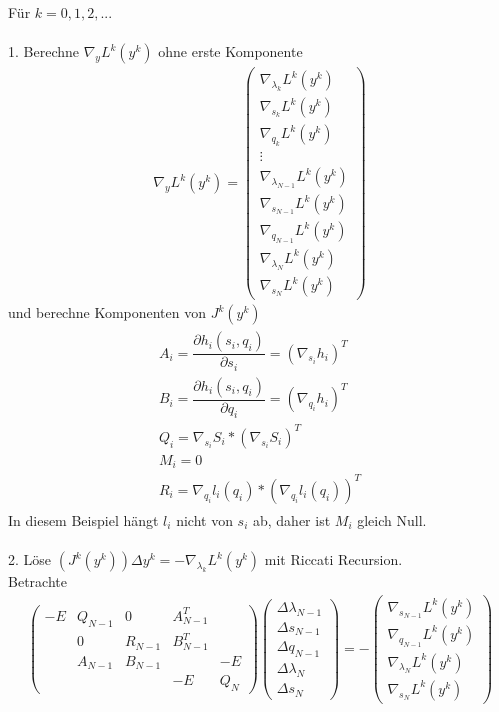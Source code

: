 \documentclass[12pt,a4paper]{article}
\begin{document}
  Für $k = 0,1,2,...$ \\
  \\
  1. Berechne $\nabla_y L^{k}(y^{k})$ ohne erste Komponente
  \begin{align*}
  \nabla_y L^{k}(y^{k}) = \left( \begin{array}{c}
  \nabla_{\lambda_{k}} L^{k}(y^{k}) \\ \hline
  \nabla_{s_{k}} L^{k}(y^{k}) \\
  \nabla_{q_{k}} L^{k}(y^{k}) \\
  \vdots \\
  \nabla_{\lambda_{N-1}} L^{k}(y^{k}) \\ 
  \nabla_{s_{N-1}} L^{k}(y^{k}) \\
  \nabla_{q_{N-1}} L^{k}(y^{k}) \\
  \nabla_{\lambda_{N}} L^{k}(y^{k}) \\ 
  \nabla_{s_{N}} L^{k}(y^{k})
  \end{array} \right) 
  \end{align*}
  und berechne Komponenten von $J^{k}(y^{k})$ \\
  \begin{align*}
  \begin{array}{l}
  A_i = \dfrac{\partial h_i(s_i,q_i)}{\partial s_i}= (\nabla_{s_i} h_i)^{T}\\ 
  B_i = \dfrac{\partial h_i(s_i,q_i)}{\partial q_i}= (\nabla_{q_i} h_i)^{T} \\
  Q_i = \nabla_{s_i} S_i *(\nabla_{s_i} S_i )^{T} \\
  M_i = 0 \\
  R_i = \nabla_{q_i} l_i(q_i) * (\nabla_{q_i} l_i(q_i))^{T}
  \end{array}
  \end{align*}
  In diesem Beispiel hängt $ l_i $ nicht von $s_i$ ab, daher ist $M_i$ gleich Null. \\
  \\
  2. Löse $ (J^{k}(y^{k})) \Delta y^{k} =- \nabla_{\lambda_k} L^{k}(y^{k}) $ mit Riccati Recursion.\\
  Betrachte
  \begin{align*}
  \begin{pmatrix}
  -E & Q_{N-1} & 0 & A_{N-1}^{T} &  \\
     & 0 & R_{N-1} & B_{N-1}^{T} &  \\
     & A_{N-1} & B_{N-1} &   & -E \\
     &   &   & -E & Q_N
  \end{pmatrix}
  \begin{pmatrix}
  \Delta \lambda_{N-1} \\
  \Delta s_{N-1} \\
  \Delta q_{N-1} \\
  \Delta \lambda_{N} \\
  \Delta s_N
  \end{pmatrix} =-
  \begin{pmatrix}
  \nabla_{s_{N-1}} L^{k}(y^{k}) \\
  \nabla_{q_{N-1}} L^{k}(y^{k}) \\
  \nabla_{\lambda_{N}} L^{k}(y^{k}) \\ 
  \nabla_{s_{N}} L^{k}(y^{k})
  \end{pmatrix}
  \end{align*}
\end{document}

